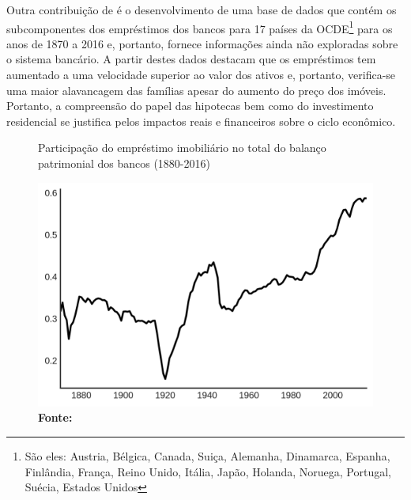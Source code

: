 Outra contribuição de \citeauthor*{jorda_great_2014} é o desenvolvimento de uma base de dados que contém os subcomponentes dos empréstimos dos bancos para 17 países da OCDE\footnote{São eles: Austria, Bélgica, Canada, Suiça, Alemanha, Dinamarca, Espanha, Finlândia, França, Reino Unido, Itália, Japão, Holanda, Noruega, Portugal, Suécia, Estados Unidos} para os anos de 1870 a 2016 e, portanto, fornece informações ainda não exploradas sobre o sistema bancário. A partir destes dados destacam que os empréstimos tem aumentado a uma velocidade superior ao valor dos ativos e, portanto, verifica-se uma maior alavancagem das famílias apesar do aumento do preço dos imóveis. Portanto, a compreensão do papel das hipotecas bem como do investimento residencial se justifica pelos impactos reais e financeiros sobre o ciclo econômico.



\begin{figure}
	\centering
	\caption{Participação do empréstimo imobiliário no total do balanço patrimonial dos bancos (1880-2016)}
	\label{GraficoJorda}
	\includegraphics{Jorda_Mean.png}
	\caption*{\textbf{Fonte:}}
\end{figure}


